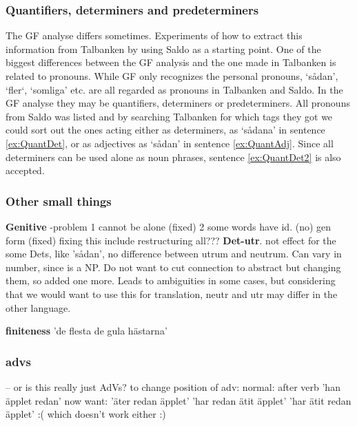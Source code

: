 \documentclass{report}
\begin{document}
\subsubsection{Quantifiers, determiners and predeterminers}
\label{sec:gf.quant}
The GF analyse differs sometimes. Experiments of how to extract
this information from Talbanken by using Saldo as a starting point.
One of the biggest differences between the GF analysis and the one made in Talbanken
is related to pronouns. While GF only recognizes the personal pronouns, 
`sådan', `fler`, `somliga' etc. are all regarded as pronouns in Talbanken and Saldo.
In the GF analyse they may be quantifiers, determiners or predeterminers. 
All pronouns from Saldo was listed and by searching Talbanken for which tags
they got we could sort out the ones acting either as
determiners, as `sådana' in sentence \ref{ex:QuantDet}, or as adjectives as
`sådan' in sentence \ref{ex:QuantAdj}. 
\label{ex:QuantDet}
\vspace{-3mm}
\label{ex:QuantAdj}
\vspace{-3mm}
\label{ex:QuantDet2}
Since all determiners can be used alone as noun phrases, sentence
\ref{ex:QuantDet2} is also accepted.

\subsubsection{Other small things}

\textbf{Genitive} -problem 1 cannot be alone (fixed) 2 some words have id. (no) gen form (fixed)
           fixing this include restructuring all???
\textbf{Det-utr}. not effect for the some Dets, like 'sådan', no difference between utrum and neutrum.
 Can vary in number, since is a NP. Do not want to cut connection to abstract but changing them,
 so added one more. Leads to ambiguities in some cases, but considering that we would want to use
 this for translation, neutr and utr may differ in the other language.

\textbf{finiteness}
 'de flesta de gula hästarna'

\subsubsection{advs}
-- or is this really just AdVs? 
to change position of adv:
normal: after verb 'han äpplet redan'
now want: 'äter redan äpplet'
          'har redan ätit äpplet' 
          'har ätit redan äpplet' :( which doesn't work either :)
\end{document}
